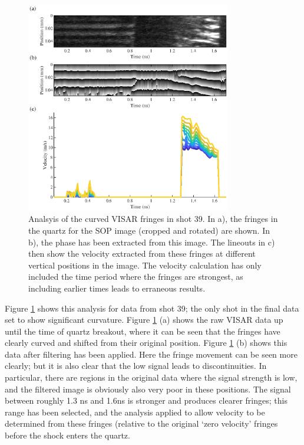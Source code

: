 \begin{figure} [h]
\begin{centering}
\includegraphics[width=0.8\textwidth]{figures/Experiment/VISARdata.eps}%
\caption{\label{fig:VISAR curvature analysis} Analsyis of the curved VISAR fringes in shot 39. In a), the fringes in the quartz for the SOP image (cropped and rotated) are shown. In b), the phase has been extracted from this image. The lineouts in c) then show the velocity extracted from these fringes at different vertical positions in the image. The velocity calculation has only included the time period where the fringes are strongest, as including earlier times leads to erraneous results.}
\end{centering}
\end{figure}

Figure \ref{fig:VISAR curvature analysis} shows this analysis for data from shot 39; the only shot in the final data set to show significant curvature. Figure \ref{fig:VISAR curvature analysis} (a) shows the raw VISAR data up until the time of quartz breakout, where it can be seen that the fringes have clearly curved and shifted from their original position. Figure \ref{fig:VISAR curvature analysis} (b) shows this data after filtering has been applied. Here the fringe movement can be seen more clearly; but it is also clear that the low signal leads to discontinuities. In particular, there are regions in the original data where the signal strength is low, and the filtered image is obviously also very poor in these positions. The signal between roughly 1.3 ns and 1.6ns is stronger and produces clearer fringes; this range has been selected, and the analysis applied to allow velocity to be determined from these fringes (relative to the original `zero velocity' fringes before the shock enters the quartz.

